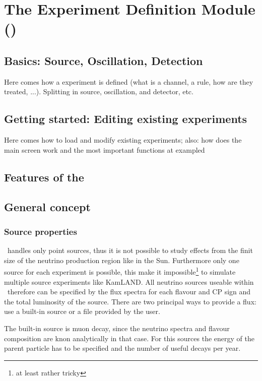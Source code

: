 
\part{The Experiment Definition Module (\EDM )}

\chapter{Basics: Source, Oscillation, Detection}

Here comes how a experiment is defined (what is a channel, a rule, how are 
they treated, ...). Splitting in source, oscillation, and detector, etc.

\chapter{Getting started: Editing existing experiments}

Here comes how to load and modify existing experiments;
also: how does the main screen work and the most important functions at 
exampled

\chapter{Features of the \EDM }


\chapter{General concept}
\section{Source properties}

\GLOBES\ handles only point sources, thus it is not possible
to study effects from the finit size of the neutrino production
region like in the Sun. Furthermore only one source for each experiment
is possible, this make it impossible\footnote{at least rather tricky} 
to simulate multiple source experiments like KamLAND. All neutrino
sources useable within \GLOBES\ therefore can be specified by the
flux spectra for each flavour and CP sign and the total luminosity
of the source. There are two principal ways to provide a flux:
use a built-in source or a file provided by the user. 

The built-in source is muon decay, since the neutrino
spectra and flavour composition are knon analytically in that case. For 
this sources the energy of the parent particle has to be specified
and the number of useful decays per year.

